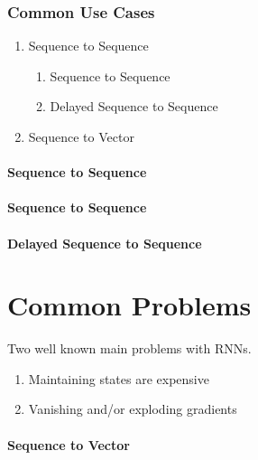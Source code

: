 \subsubsection{Common Use Cases}

\begin{enumerate}[noitemsep,topsep=0pt]
	\item Sequence to Sequence
	\begin{enumerate}[noitemsep,topsep=0pt]
		\item Sequence to Sequence
		\item Delayed Sequence to Sequence
	\end{enumerate}
	\item Sequence to Vector
\end{enumerate}


\paragraph{Sequence to Sequence}


\paragraph{Sequence to Sequence}


\paragraph{Delayed Sequence to Sequence}


\section{Common Problems}

Two well known main problems with RNNs.

\begin{enumerate}[noitemsep,topsep=0pt]
	\item Maintaining states are expensive
	\item Vanishing and/or exploding gradients
\end{enumerate}

\paragraph{Sequence to Vector}